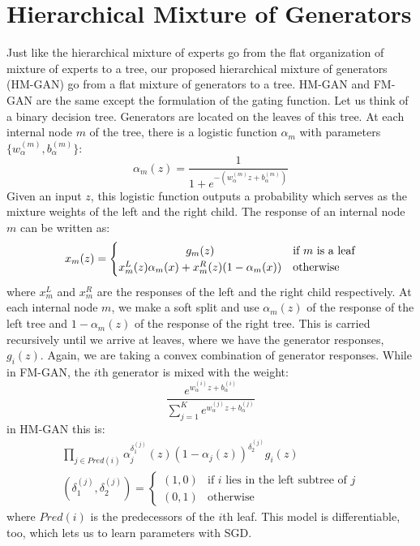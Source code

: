 \documentclass[a4paper,onesided,12pt]{report}
\begin{document}
\section{Hierarchical Mixture of Generators}
\label{sec:hmgan}
Just like the hierarchical mixture of experts \cite{jordan1994hierarchical} go from the flat organization of mixture of experts  \cite{jacobs1991adaptive} to a tree, our proposed hierarchical mixture of generators (HM-GAN) go from a flat mixture of generators to a tree. HM-GAN and FM-GAN are the same except the formulation of the gating function. Let us think of a binary decision tree. Generators are located on the leaves of this tree. At each internal node $m$ of the tree, there is a logistic function $\alpha_m$ with parameters $\{w_{\alpha}^{(m)}, b_{\alpha}^{(m)}\}$:
\begin{equation}
\alpha_m(z) = \frac{1}{1+e^{-(w_{\alpha}^{(m)} z + b_{\alpha}^{(m)})}}
\label{eq:sigmoid}
\end{equation}
Given an input $z$, this logistic function outputs a probability which serves as the mixture weights of the left and the right child. The response of an internal node $m$ can be written as:
\begin{equation}
x_m(z)=
	\begin{cases}
		\hfil g_m(z) &\text{if $m$ is a leaf} \\
		\hfil x_m^{L}(z)\alpha_m(x) + x_m^{R}(z)(1 - \alpha_m(x)) &\text{otherwise}
	\end{cases}
\label{eq:hmgan2}
\end{equation}
where $x_m^L$ and $x_m^R$ are the responses of the left and the right child respectively. At each internal node $m$, we make a soft split and use $\alpha_m(z)$ of the response of the left tree and $1-\alpha_m(z)$ of the response of the right tree. This is carried recursively until we arrive at leaves, where we have the generator responses, $g_i(z)$. Again, we are taking a convex combination of generator responses. While in FM-GAN, the $i$th generator is mixed with the weight:
\begin{equation}
\frac{e^{w_{\alpha}^{(i)} z + b_{\alpha}^{(i)}}}{\sum_{j=1}^K e^{w_{\alpha}^{(j)} z + b_{\alpha}^{(j)}}}
\label{eq:fm_mix}
\end{equation}
in HM-GAN this is:
\begin{gather}
\prod_{j \in Pred(i)} \alpha_j^{\delta_1^{(j)}}(z) (1-\alpha_j(z))^{\delta_2^{(j)}} g_i(z)\\
(\delta_1^{(j)}, \delta_2^{(j)}) =
	\begin{cases}
		(1, 0) & \text{if $i$ lies in the left subtree of $j$} \\
		(0, 1) & \text{otherwise}	
	\end{cases}
\label{eq:hm_mix}
\end{gather}
where $Pred(i)$ is the predecessors of the $i$th leaf. This model is differentiable, too, which lets us to learn parameters with SGD.
\end{document}
